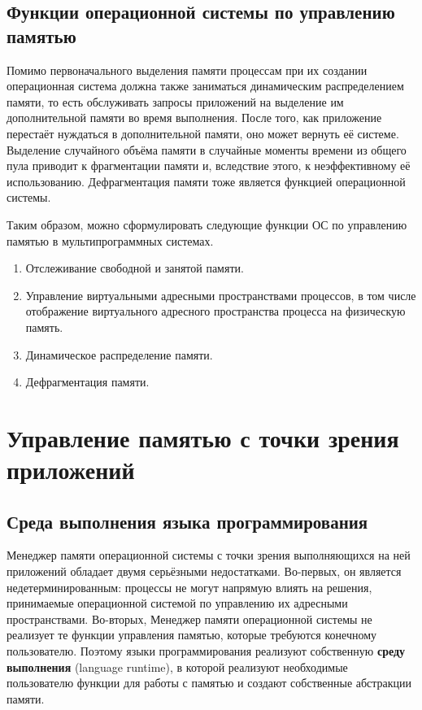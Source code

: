 \subsection{Функции операционной системы по управлению памятью}

Помимо первоначального выделения памяти процессам при их создании операционная система должна также заниматься динамическим распределением памяти, то есть обслуживать запросы приложений на выделение им дополнительной памяти во время выполнения. После того, как приложение перестаёт нуждаться в дополнительной памяти, оно может вернуть её системе. Выделение случайного объёма памяти в случайные моменты времени из общего пула приводит к фрагментации памяти и, вследствие этого, к неэффективному её использованию. Дефрагментация памяти тоже является функцией операционной системы.

Таким образом, можно сформулировать следующие функции ОС по управлению памятью в мультипрограммных системах.

\begin{enumerate}[label*=\arabic*.]
	\item Отслеживание свободной и занятой памяти.
	\item Управление виртуальными адресными пространствами процессов, в том числе отображение виртуального адресного пространства процесса на физическую память.
	\item Динамическое распределение памяти. 
	\item Дефрагментация памяти. 
\end{enumerate}



\section{Управление памятью с точки зрения приложений}

\subsection{Среда выполнения языка программирования}

Менеджер памяти операционной системы с точки зрения выполняющихся на ней приложений обладает двумя серьёзными недостатками. Во-первых, он является недетерминированным: процессы не могут напрямую влиять на решения, принимаемые операционной системой по управлению их адресными пространствами. Во-вторых, Менеджер памяти операционной системы не реализует те функции управления памятью, которые требуются конечному пользователю. Поэтому языки программирования реализуют собственную \textbf{среду выполнения} (language runtime), в которой реализуют необходимые пользователю функции для работы с памятью и создают собственные абстракции памяти.

